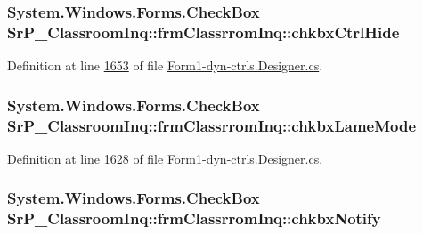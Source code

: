 \hypertarget{class_sr_p___classroom_inq_1_1frm_classrrom_inq_a65b5726e5b2299abee70eba1a67b6ea3}{
\subsubsection[{chkbx\-Ctrl\-Hide}]{\setlength{\rightskip}{0pt plus 5cm}\-System.\-Windows.\-Forms.\-Check\-Box {\bf \-Sr\-P\-\_\-\-Classroom\-Inq\-::frm\-Classrrom\-Inq\-::chkbx\-Ctrl\-Hide}}}
\label{class_sr_p___classroom_inq_1_1frm_classrrom_inq_a65b5726e5b2299abee70eba1a67b6ea3}


\-Definition at line \hyperlink{_form1-dyn-ctrls_8_designer_8cs_source_l01653}{1653} of file \hyperlink{_form1-dyn-ctrls_8_designer_8cs_source}{\-Form1-\/dyn-\/ctrls.\-Designer.\-cs}.

\hypertarget{class_sr_p___classroom_inq_1_1frm_classrrom_inq_ae2a9d3b663f7c88374a93c3cd9ef6eca}{
\subsubsection[{chkbx\-Lame\-Mode}]{\setlength{\rightskip}{0pt plus 5cm}\-System.\-Windows.\-Forms.\-Check\-Box {\bf \-Sr\-P\-\_\-\-Classroom\-Inq\-::frm\-Classrrom\-Inq\-::chkbx\-Lame\-Mode}}}
\label{class_sr_p___classroom_inq_1_1frm_classrrom_inq_ae2a9d3b663f7c88374a93c3cd9ef6eca}


\-Definition at line \hyperlink{_form1-dyn-ctrls_8_designer_8cs_source_l01628}{1628} of file \hyperlink{_form1-dyn-ctrls_8_designer_8cs_source}{\-Form1-\/dyn-\/ctrls.\-Designer.\-cs}.

\hypertarget{class_sr_p___classroom_inq_1_1frm_classrrom_inq_a86f98a8c743985a65d129f24ed240ba6}{
\subsubsection[{chkbx\-Notify}]{\setlength{\rightskip}{0pt plus 5cm}\-System.\-Windows.\-Forms.\-Check\-Box {\bf \-Sr\-P\-\_\-\-Classroom\-Inq\-::frm\-Classrrom\-Inq\-::chkbx\-Notify}}}
\label{class_sr_p___classroom_inq_1_1frm_classrrom_inq_a86f98a8c743985a65d129f24ed240ba6}


